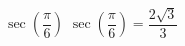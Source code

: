 {$\sec \left( \dfrac{\pi}{6} \right)$}
{$\sec \left( \dfrac{\pi}{6} \right) = \dfrac{2\sqrt{3}}{3}$}
